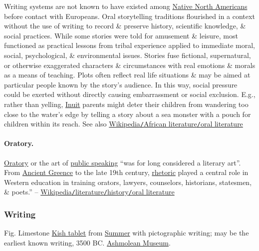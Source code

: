 \documentclass[oneside]{book}
\numberwithin{equation}{section}
\begin{document}
Writing systems are not known to have existed among \href{https://en.wikipedia.org/wiki/Native_North_Americans}{Native North Americans} before contact with Europeans. Oral storytelling traditions flourished in a context without the use of writing to record \& preserve history, scientific knowledge, \& social practices. While some stories were told for amusement \& leisure, most functioned as practical lessons from tribal experience applied to immediate moral, social, psychological, \& environmental issues. Stories fuse fictional, supernatural, or otherwise exaggerated characters \& circumstances with real emotions \& morals as a means of teaching. Plots often reflect real life situations \& may be aimed at particular people known by the story's audience. In this way, social pressure could be exerted without directly causing embarrassment or social exclusion. E.g., rather than yelling, \href{https://en.wikipedia.org/wiki/Inuit_culture}{Inuit} parents might deter their children from wandering too close to the water's edge by telling a story about a sea monster with a pouch for children within its reach. See also \href{https://en.wikipedia.org/wiki/African_literature#Oral_literature}{Wikipedia\texttt{/}African literature\texttt{/}oral literature}

\paragraph{Oratory.} \href{https://en.wikipedia.org/wiki/Rhetoric}{Oratory} or the art of \href{https://en.wikipedia.org/wiki/Public_speaking}{public speaking} ``was for long considered a literary art''. From \href{https://en.wikipedia.org/wiki/Ancient_Greece}{Ancient Greence} to the late 19th century, \href{https://en.wikipedia.org/wiki/Rhetoric}{rhetoric} played a central role in Western education in training orators, lawyers, counselors, historians, statesmen, \& poets.'' -- \href{https://en.wikipedia.org/wiki/Literature#Oral_literature}{Wikipedia\texttt{/}literature\texttt{/}history\texttt{/}oral literature}

\subsubsection{Writing}
\textsf{Fig. Limestone \href{https://en.wikipedia.org/wiki/Kish_tablet}{Kish tablet} from \href{https://en.wikipedia.org/wiki/Sumer}{Summer} with pictographic writing; may be the earliest known writing, 3500 BC. \href{https://en.wikipedia.org/wiki/Ashmolean_Museum}{Ashmolean Museum}.}
\end{document}
